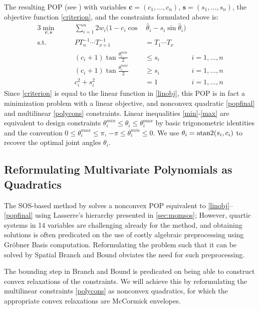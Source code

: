 The resulting POP (see \cite[(9)]{trutman2022globally}) with variables $\mathbf{c}=(c_1,\dots,c_n)$, $\mathbf{s}=(s_1,\dots,s_n)$, the objective function \eqref{criterion}, and the constraints formulated above is:
\begin{alignat}{3}
\min_{\mathbf{c}, \mathbf{s}} &\quad& \sum_{i=1}^n 2w_i(1-c_i\cos&\,\hat{\theta}_i-s_i\sin\hat{\theta}_i) \label{linobj}    \\
\text{s.t.}   &\quad&     P T_n^{-1}\dotsb T_{\nu+1}^{-1} &= T_1\dotsb T_\nu \label{polycons}\\
              &\quad& (c_i + 1) \tan \frac{\theta^{\mathit{min}}_i}{2} & \le s_i &i=1,\dots,n \label{min}\\
              &\quad& (c_i + 1) \tan \frac{\theta^{\mathit{max}}_i}{2} & \ge s_i &i=1,\dots,n \label{max}\\
              &\quad&                                    c_i^2 + s_i^2 &  =  1   &i=1,\dots,n \label{popfinal}
\end{alignat}
Since \eqref{criterion} is equal to the linear function in  \eqref{linobj}, this POP is in fact a minimization problem with a linear objective, and nonconvex quadratic \ref{popfinal} and multilinear \ref{polycons} constraints. Linear inequalities \eqref{min}-\eqref{max} are equivalent to design constraints $\theta^{\mathit{min}}_i\le \theta_i \le \theta^{\mathit{max}}_i$ by basic trigonometric identities and the convention $0\le\theta^{\mathit{max}}_i\le \pi$,  $-\pi\le\theta^{\mathit{min}}_i\le 0$. We use $\theta_i = \operatorname{atan2}(s_i, c_i)$ to recover the optimal joint angles $\theta_i$.

\subsection{Reformulating Multivariate Polynomials as Quadratics}\label{sec:lift}
The SOS-based method by \textcite{trutman2022globally} solves a nonconvex POP equivalent to \eqref{linobj}--\eqref{popfinal} using Lasserre's hierarchy presented in \cref{sec:momsos}; However, quartic systems in 14 variables are challenging already for the method, and obtaining solutions is often predicated on the use of costly algebraic preprocessing using Gröbner Basis computation. Reformulating the problem such that it can be solved by Spatial Branch and Bound obviates the need for such preprocessing.

The bounding step in Branch and Bound is predicated on being able to construct convex relaxations of the constraints. We will achieve this by reformulating the multilinear constraints \ref{polycons} as nonconvex quadratics, for which the appropriate convex relaxations are McCormick envelopes.

